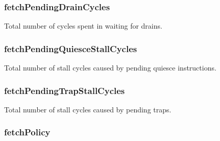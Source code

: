 \label{classDefaultFetch_afc52fdca94918eaaf908094a80ab63ce}
\hypertarget{classDefaultFetch_ad09f9a8597b6f2c627b5c116d85ea375}{
\subsubsection[{fetchPendingDrainCycles}]{ {\bf fetchPendingDrainCycles}}}
\label{classDefaultFetch_ad09f9a8597b6f2c627b5c116d85ea375}
Total number of cycles spent in waiting for drains. \hypertarget{classDefaultFetch_a8be39e4ea9ed9168227dc6efced55f3f}{
\subsubsection[{fetchPendingQuiesceStallCycles}]{ {\bf fetchPendingQuiesceStallCycles}}}
\label{classDefaultFetch_a8be39e4ea9ed9168227dc6efced55f3f}
Total number of stall cycles caused by pending quiesce instructions. \hypertarget{classDefaultFetch_a5a80cd5375f1281e64f0dd318cc761d2}{
\subsubsection[{fetchPendingTrapStallCycles}]{ {\bf fetchPendingTrapStallCycles}}}
\label{classDefaultFetch_a5a80cd5375f1281e64f0dd318cc761d2}
Total number of stall cycles caused by pending traps. \hypertarget{classDefaultFetch_aad8c2ca9262308cfdb74cd69cda508f6}{
\subsubsection[{fetchPolicy}]{ {\bf fetchPolicy}}}
